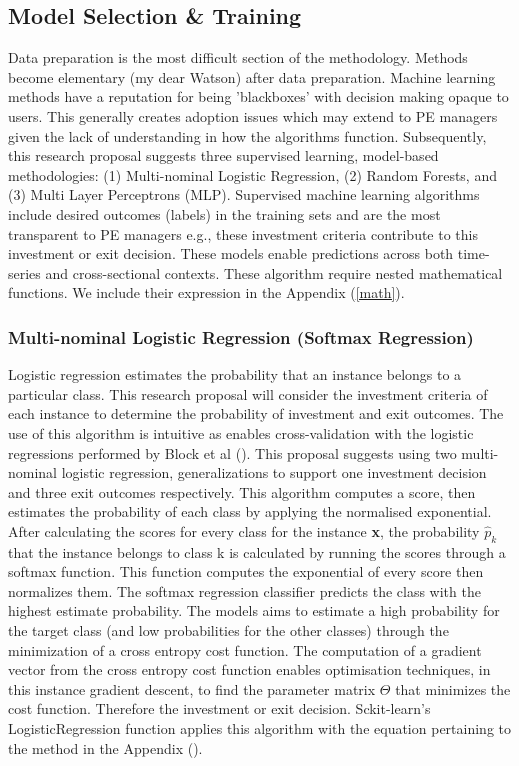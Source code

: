 \documentclass[12pt]{article}
\begin{document}
\subsection{Model Selection \& Training} \label{algorithms}
Data preparation is the most difficult section of the methodology.
Methods become elementary (my dear Watson) after data preparation.
Machine learning methods have a reputation for being 'blackboxes' with decision making opaque to users.
This generally creates adoption issues which may extend to PE managers given the lack of understanding in how the algorithms function.
Subsequently, this research proposal suggests three supervised learning, model-based methodologies: (1) Multi-nominal Logistic Regression, (2) Random Forests, and (3) Multi Layer Perceptrons (MLP).
Supervised machine learning algorithms include desired outcomes (labels) in the training sets and are the most transparent to PE managers e.g., these investment criteria contribute to this investment or exit decision.
These models enable predictions across both time-series and cross-sectional contexts.
These algorithm require nested mathematical functions.
We include their expression in the Appendix (\ref{math}).
\subsubsection{Multi-nominal Logistic Regression (Softmax Regression)}
Logistic regression estimates the probability that an instance belongs to a particular class.
This research proposal will consider the investment criteria of each instance to determine the probability of investment and exit outcomes.
The use of this algorithm is intuitive as enables cross-validation with the logistic regressions performed by Block et al (\citeyear{BLOCK2019329}).
This proposal suggests using two multi-nominal logistic regression, generalizations to support one investment decision and three exit outcomes respectively.
This algorithm computes a score, then estimates the probability of each class by applying the normalised exponential.
After calculating the scores for every class for the instance \textbf{x}, the probability $\hat{p}_{k}$ that the instance belongs to class k is calculated by running the scores 
through a softmax function. This function computes the exponential of every score then normalizes them.
The softmax regression classifier predicts the class with the highest estimate probability.
The models aims to estimate a high probability for the target class (and low probabilities for the other classes) through the minimization of a cross entropy cost function.
The computation of a gradient vector from the cross entropy cost function enables optimisation techniques, in this instance gradient descent, to find the parameter matrix $\Theta$ that minimizes the cost function.
Therefore the investment or exit decision.
Sckit-learn's LogisticRegression function applies this algorithm with the equation pertaining to the method in the Appendix (\label{mnlr-sr-math}).
\end{document}
